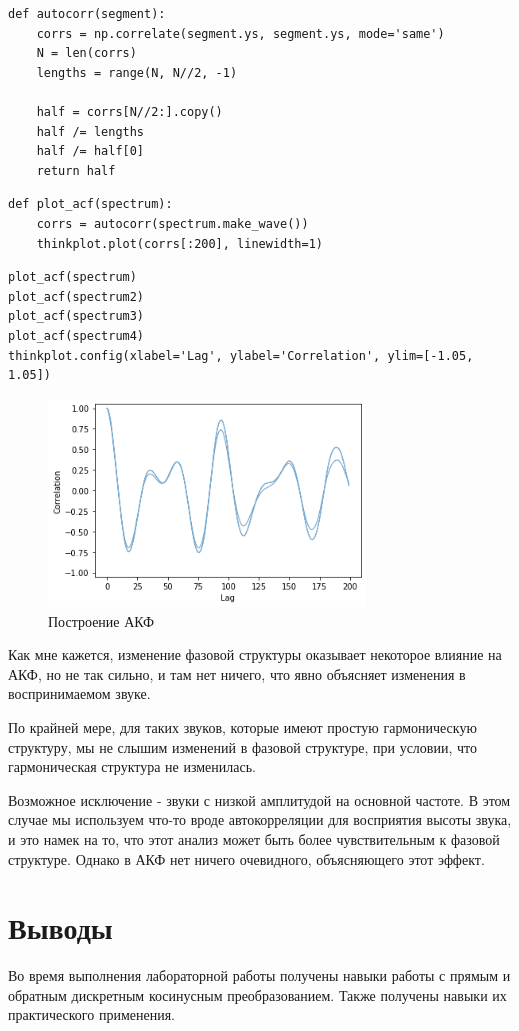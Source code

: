 \documentclass[a4paper,12pt]{report}
\begin{document}
\begin{lstlisting}[caption=Функция \texttt{autocorr}]
def autocorr(segment):
    corrs = np.correlate(segment.ys, segment.ys, mode='same')
    N = len(corrs)
    lengths = range(N, N//2, -1)

    half = corrs[N//2:].copy()
    half /= lengths
    half /= half[0]
    return half
\end{lstlisting}

\begin{lstlisting}[caption=Функция \texttt{plot\_acf}]
def plot_acf(spectrum):
    corrs = autocorr(spectrum.make_wave())
    thinkplot.plot(corrs[:200], linewidth=1)
\end{lstlisting}

\begin{lstlisting}[caption=Построение АКФ]
plot_acf(spectrum)
plot_acf(spectrum2)
plot_acf(spectrum3)
plot_acf(spectrum4)
thinkplot.config(xlabel='Lag', ylabel='Correlation', ylim=[-1.05, 1.05])
\end{lstlisting}

\begin{figure}[H]
        \centering
        \includegraphics[width=0.75\textwidth]{lab6_fig3_22.png}
        \caption{Построение АКФ}
        \label{fig:lab6_fig3_22}
\end{figure}

Как мне кажется, изменение фазовой структуры оказывает некоторое влияние на АКФ, но не так сильно, и там нет ничего, что явно объясняет изменения в воспринимаемом звуке.

По крайней мере, для таких звуков, которые имеют простую гармоническую структуру, мы не слышим изменений в фазовой структуре, при условии, что гармоническая структура не изменилась.

Возможное исключение - звуки с низкой амплитудой на основной частоте. В этом случае мы используем что-то вроде автокорреляции для восприятия высоты звука, и это намек на то, что этот анализ может быть более чувствительным к фазовой структуре. Однако в АКФ нет ничего очевидного, объясняющего этот эффект.

\chapter{Выводы}

Во время выполнения лабораторной работы получены навыки работы с прямым и обратным дискретным косинусным преобразованием. Также получены навыки их практического применения.
\end{document}
